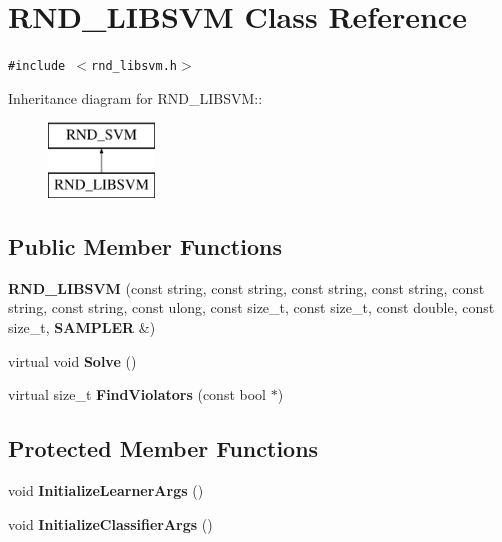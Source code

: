 \section{RND\_\-LIBSVM Class Reference}
\label{classRND__LIBSVM}
{\tt \#include $<$rnd\_\-libsvm.h$>$}

Inheritance diagram for RND\_\-LIBSVM::\begin{figure}[H]
\begin{center}
\leavevmode
\includegraphics[height=2cm]{classRND__LIBSVM}
\end{center}
\end{figure}
\subsection*{Public Member Functions}
\begin{CompactItemize}
\item 
\textbf{RND\_\-LIBSVM} (const string, const string, const string, const string, const string, const string, const ulong, const size\_\-t, const size\_\-t, const double, const size\_\-t, {\bf SAMPLER} \&)\label{classRND__LIBSVM_bcc4532652adc2a626f9a57c2ccd8d83}

\item 
virtual void \textbf{Solve} ()\label{classRND__LIBSVM_00843cdb3984dcf0ca1cf2da63b3a9d3}

\item 
virtual size\_\-t \textbf{FindViolators} (const bool $\ast$)\label{classRND__LIBSVM_72a929c8427be1353e3e0ae022988fab}

\end{CompactItemize}
\subsection*{Protected Member Functions}
\begin{CompactItemize}
\item 
void \textbf{InitializeLearnerArgs} ()\label{classRND__LIBSVM_ea322020dd9db4de96fa21bc43b4aac0}

\item 
void \textbf{InitializeClassifierArgs} ()\label{classRND__LIBSVM_afe70d616638b015e9b0abf84a8d54f8}

\end{CompactItemize}
